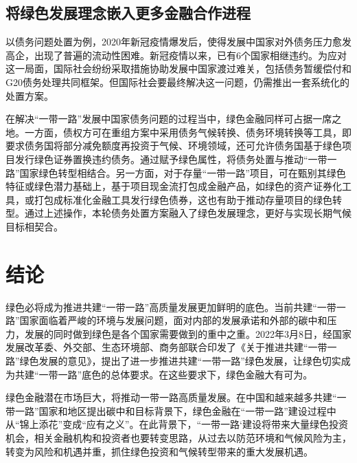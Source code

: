 \documentclass[a4paper,12pt]{ctexart}
\begin{document}
\subsection*{将绿色发展理念嵌入更多金融合作进程}
以债务问题处置为例，2020年新冠疫情爆发后，使得发展中国家对外债务压力愈发高企，出现了普遍的流动性困难。新冠疫情以来，已有6个国家相继违约。为应对这一局面，国际社会纷纷采取措施协助发展中国家渡过难关，包括债务暂缓偿付和G20债务处理共同框架。但国际社会要最终解决这一问题，仍需推出一套系统化的处置方案。

在解决“一带一路”发展中国家债务问题的过程当中，绿色金融同样可占据一席之地。一方面，债权方可在重组方案中采用债务气候转换、债务环境转换等工具，即要求债务国将部分减免额度再投资于气候、环境领域，还可允许债务国基于绿色项目发行绿色证券置换违约债务。通过赋予绿色属性，将债务处置与推动“一带一路”国家绿色转型相结合。另一方面，对于存量“一带一路”项目，可在甄别其绿色特征或绿色潜力基础上，基于项目现金流打包成金融产品，如绿色的资产证券化工具，或打包成标准化金融工具发行绿色债券，这也有助于推动存量项目的绿色转型。通过上述操作，本轮债务处置方案融入了绿色发展理念，更好与实现长期气候目标相契合。

\section*{结论}
绿色必将成为推进共建“一带一路”高质量发展更加鲜明的底色。当前共建“一带一路”国家面临着严峻的环境与发展问题，面对内部的发展承诺和外部的碳中和压力，发展的同时做到绿色是各个国家需要做到的重中之重。2022年3月8日，经国家发展改革委、外交部、生态环境部、商务部联合印发了《关于推进共建“一带一路”绿色发展的意见》，提出了进一步推进共建“一带一路”绿色发展，让绿色切实成为共建“一带一路”底色的总体要求。在这些要求下，绿色金融大有可为。

绿色金融潜在市场巨大，将推动一带一路高质量发展。在中国和越来越多共建“一带一路”国家和地区提出碳中和目标背景下，绿色金融在“一带一路”建设过程中从“锦上添花”变成“应有之义”。在此背景下，“一带一路‘建设将带来大量绿色投资机会，相关金融机构和投资者也要转变思路，从过去以防范环境和气候风险为主，转变为风险和机遇并重，抓住绿色投资和气候转型带来的重大发展机遇。
\nocite{*}
\printbibliography
\end{document}
